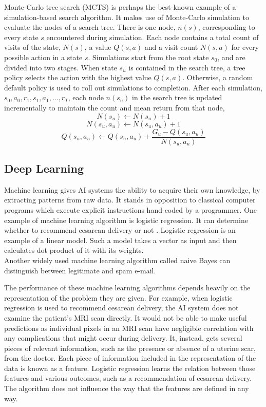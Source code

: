 Monte-Carlo tree search (MCTS) is perhaps the best-known example of a simulation-based search algorithm. It makes use of Monte-Carlo simulation to evaluate the nodes of a search tree. There is one node, $n(s)$, corresponding to every state $s$ encountered during simulation. Each node contains a total count of visits of the state, $N(s)$, a value $Q(s, a)$ and a visit count $N(s, a)$ for every possible action in a state $s$. Simulations start from the root state $s_0$, and are divided into two stages. When state $s_u$ is contained in the search tree, a tree policy selects the action with the highest value $Q(s, a)$. Otherwise, a random default policy is used to roll out simulations to completion. After each simulation, $s_0, a_0, r_1, s_1, a_1, ..., r_T$, each node $n(s_u)$ in the search tree is updated incrementally to maintain the count and mean return from that node,
$$N(s_u) \leftarrow N(s_u) + 1$$
$$N(s_u, a_u) \leftarrow N(s_u, a_u) + 1$$
$$Q(s_u, a_u) \leftarrow Q(s_u, a_u) + \frac{G_u - Q(s_u, a_u)}{N(s_u, a_u)}$$

\subsection{Deep Learning}

Machine learning gives AI systems the ability to acquire their own knowledge, by extracting patterns from raw data. It stands in opposition to classical computer programs which execute explicit instructions hand-coded by a programmer.
One example of machine learning algorithm is logistic regression. It can determine whether to recommend cesarean delivery or not \cite{Study.Cesarean}. Logistic regression is an example of a linear model. Such a model takes a vector as input and then calculates dot product of it with its weights. \\
Another widely used machine learning algorithm called naive Bayes can distinguish between legitimate and spam e-mail.

The performance of these machine learning algorithms depends heavily on the representation of the problem they are given. For example, when logistic regression is used to recommend cesarean delivery, the AI system does not examine the patient's MRI scan directly. It would not be able to make useful predictions as individual pixels in an MRI scan have negligible correlation with any complications that might occur during delivery. It, instead, gets several pieces of relevant information, such as the presence or absence of a uterine scar, from the doctor. Each piece of information included in the representation of the data is known as a feature. Logistic regression learns the relation between those features and various outcomes, such as a recommendation of cesarean delivery. The algorithm does not influence the way that the features are defined in any way.

